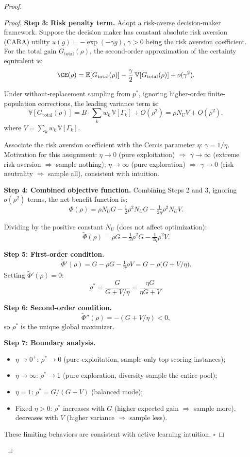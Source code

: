 \documentclass[12pt,a4paper]{article}
\newcommand{\E}{\mathbb{E}}
\newcommand{\V}{\mathbb{V}}
\begin{document}
\begin{proof}
\begin{proof}
\textbf{Step 3: Risk penalty term.}
Adopt a risk-averse decision-maker framework. Suppose the decision maker has constant absolute risk aversion (CARA) utility
$u(g)=-\exp(-\gamma g)$, $\gamma>0$ being the risk aversion coefficient.
For the total gain $G_{\text{total}}(\rho)$, the second-order approximation of the certainty equivalent is:
\[
\CE(\rho) = \E[G_{\text{total}}(\rho)] - \frac\gamma2\,\V[G_{\text{total}}(\rho)] + o(\gamma^2).
\]

Under without-replacement sampling from $p^*$, ignoring higher-order finite-population corrections, the leading variance term is:
\[
\V[G_{\text{total}}(\rho)] = B\cdot\sum_k w_k\,\V[\Gamma_k] + O(\rho^2)
= \rho N_U V + O(\rho^2),
\]
where $V = \sum_k w_k\,\V[\Gamma_k]$.

Associate the risk aversion coefficient with the Cercis parameter $\eta$: $\gamma = 1/\eta$.
Motivation for this assignment: $\eta\to0$ (pure exploitation) $\Rightarrow$ $\gamma\to\infty$ (extreme risk aversion $\Rightarrow$ sample nothing);
$\eta\to\infty$ (pure exploration) $\Rightarrow$ $\gamma\to0$ (risk neutrality $\Rightarrow$ sample all), consistent with intuition.

\textbf{Step 4: Combined objective function.}
Combining Steps 2 and 3, ignoring $o(\rho^2)$ terms, the net benefit function is:
\[
\Phi(\rho) = \rho N_U G - \tfrac12\rho^2 N_U G - \tfrac1{2\eta}\rho^2 N_U V.
\]

Dividing by the positive constant $N_U$ (does not affect optimization):
\[
\tilde\Phi(\rho) = \rho G - \tfrac12\rho^2 G - \tfrac1{2\eta}\rho^2 V.
\]

\textbf{Step 5: First-order condition.}
\[
\tilde\Phi'(\rho) = G - \rho G - \tfrac1\eta\rho V
= G - \rho\big(G + V/\eta\big).
\]
Setting $\tilde\Phi'(\rho)=0$:
\[
\rho^* = \frac{G}{G + V/\eta}
= \frac{\eta G}{\eta G + V}.
\]

\textbf{Step 6: Second-order condition.}
\[
\tilde\Phi''(\rho) = -(G + V/\eta) < 0,
\]
so $\rho^*$ is the unique global maximizer.

\textbf{Step 7: Boundary analysis.}
\begin{itemize}
    \item $\eta\to0^+$: $\rho^*\to0$ (pure exploitation, sample only top-scoring instances);
    \item $\eta\to\infty$: $\rho^*\to1$ (pure exploration, diversity-sample the entire pool);
    \item $\eta=1$: $\rho^* = G/(G+V)$ (balanced mode);
    \item Fixed $\eta>0$: $\rho^*$ increases with $G$ (higher expected gain $\Rightarrow$ sample more),
          decreases with $V$ (higher variance $\Rightarrow$ sample less).
\end{itemize}
These limiting behaviors are consistent with active learning intuition. \hfill$\square$


\end{proof}
\end{proof}
\end{document}
